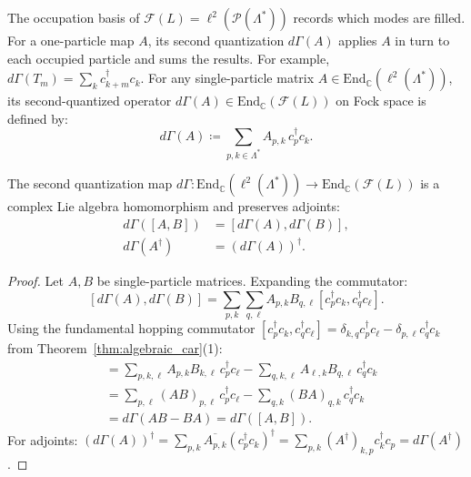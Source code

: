 \begin{definition}
The occupation basis of $\mathcal{F}(L)=\ell^2(\mathcal{P}(\Lambda^*))$ records which modes are filled. For a one-particle map $A$, its second quantization $d\Gamma(A)$ applies $A$ in turn to each occupied particle and sums the results. For example, $d\Gamma(T_m)=\sum_k c_{k+m}^\dagger c_k$.
For any single-particle matrix $A \in \mathrm{End}_{\mathbb{C}}(\ell^2(\Lambda^*))$, its second-quantized operator $d\Gamma(A) \in \mathrm{End}_{\mathbb{C}}(\mathcal{F}(L))$ on Fock space is defined by:
\begin{equation}
d\Gamma(A) \coloneqq \sum_{p, k \in \Lambda^*} A_{p, k}\, c_p^\dagger c_k.
\end{equation}
\end{definition}

\begin{lemma}
\label{lem:dgamma_comm}
The second quantization map $d\Gamma : \mathrm{End}_{\mathbb{C}}(\ell^2(\Lambda^*)) \to \mathrm{End}_{\mathbb{C}}(\mathcal{F}(L))$ is a complex Lie algebra homomorphism and preserves adjoints:
\begin{align}
d\Gamma([A, B]) &= [d\Gamma(A), d\Gamma(B)], \label{eq:dgamma_lie} \\
d\Gamma(A^\dagger) &= (d\Gamma(A))^\dagger. \label{eq:dgamma_adj}
\end{align}
\end{lemma}

\begin{proof}
Let $A, B$ be single-particle matrices. Expanding the commutator:
\[
[d\Gamma(A), d\Gamma(B)] = \sum_{p, k} \sum_{q, \ell} A_{p, k} B_{q, \ell} [c_p^\dagger c_k, c_q^\dagger c_\ell].
\]
Using the fundamental hopping commutator $[c_p^\dagger c_k, c_q^\dagger c_\ell] = \delta_{k, q} c_p^\dagger c_\ell - \delta_{p, \ell} c_q^\dagger c_k$ from Theorem~\ref{thm:algebraic_car}(1):
\begin{align*}
[d\Gamma(A), d\Gamma(B)] &= \sum_{p, k, \ell} A_{p, k} B_{k, \ell}\, c_p^\dagger c_\ell - \sum_{q, k, \ell} A_{\ell, k} B_{q, \ell}\, c_q^\dagger c_k \\
&= \sum_{p, \ell} (A B)_{p, \ell}\, c_p^\dagger c_\ell - \sum_{q, k} (B A)_{q, k}\, c_q^\dagger c_k \\
&= d\Gamma(A B - B A) = d\Gamma([A, B]).
\end{align*}
For adjoints: $(d\Gamma(A))^\dagger = \sum_{p, k} \overline{A_{p, k}} (c_p^\dagger c_k)^\dagger = \sum_{p, k} (A^\dagger)_{k, p} c_k^\dagger c_p = d\Gamma(A^\dagger)$.
\end{proof}

